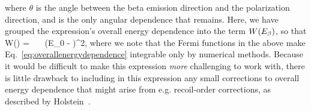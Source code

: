 \eea
where $\theta$ is the angle between the beta emission direction and the polarization direction, and is the only angular dependence that remains.  Here, we have grouped the expression's overall energy dependence into the term $W(E_{\beta})$, so that
\beq
W(\Ebeta) =  \, \FF \, \xi \, \pe \Ee (E_0 - \Ee)^2, 
\label{eq:overallenergydependence}
\eeq
where we note that the Fermi functions in the above make Eq.~\ref{eq:overallenergydependence} integrable only by numerical methods.  Because it would be difficult to make this expression \emph{more} challenging to work with, there is little drawback to including in this expression any small corrections to overall energy dependence that might arise from e.g.\! recoil-order corrections, as described by Holstein~\cite{holstein}.

